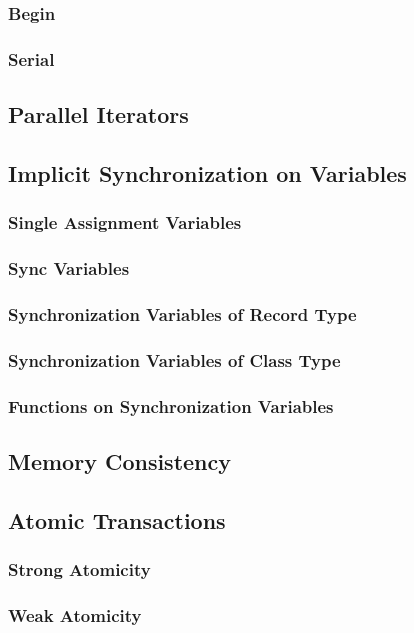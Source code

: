 \documentclass[10pt,twoside,titlepage]{article}
\begin{document}
\subsubsection{Begin}
\subsubsection{Serial}
\subsection{Parallel Iterators}
\subsection{Implicit Synchronization on Variables}
\subsubsection{Single Assignment Variables}
\subsubsection{Sync Variables}
\subsubsection{Synchronization Variables of Record Type}
\subsubsection{Synchronization Variables of Class Type}
\subsubsection{Functions on Synchronization Variables}
\subsection{Memory Consistency}
\subsection{Atomic Transactions}
\subsubsection{Strong Atomicity}
\subsubsection{Weak Atomicity}
\end{document}
